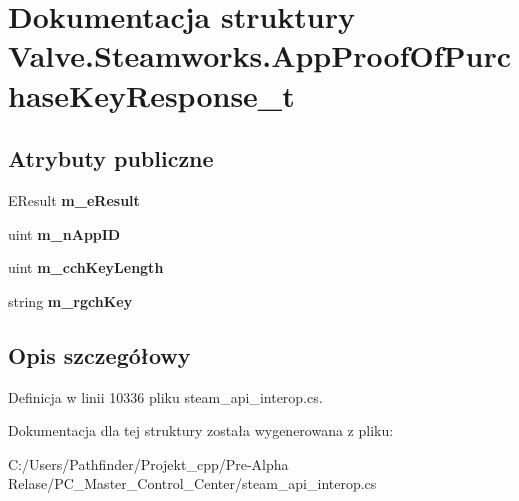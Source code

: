 \hypertarget{struct_valve_1_1_steamworks_1_1_app_proof_of_purchase_key_response__t}{}\section{Dokumentacja struktury Valve.\+Steamworks.\+App\+Proof\+Of\+Purchase\+Key\+Response\+\_\+t}
\label{struct_valve_1_1_steamworks_1_1_app_proof_of_purchase_key_response__t}
\subsection*{Atrybuty publiczne}
\begin{DoxyCompactItemize}
\item 
\mbox{\label{struct_valve_1_1_steamworks_1_1_app_proof_of_purchase_key_response__t_abcb40b93a942c7a7b2475c676a807679}} 
E\+Result {\bfseries m\+\_\+e\+Result}
\item 
\mbox{\label{struct_valve_1_1_steamworks_1_1_app_proof_of_purchase_key_response__t_ac9119233dffae29b25286fbe687e32ee}} 
uint {\bfseries m\+\_\+n\+App\+ID}
\item 
\mbox{\label{struct_valve_1_1_steamworks_1_1_app_proof_of_purchase_key_response__t_a6e352f3ce397bb6a8d24c444a5ed7025}} 
uint {\bfseries m\+\_\+cch\+Key\+Length}
\item 
\mbox{\label{struct_valve_1_1_steamworks_1_1_app_proof_of_purchase_key_response__t_ab63477802fd41c5f4140978b63098772}} 
string {\bfseries m\+\_\+rgch\+Key}
\end{DoxyCompactItemize}


\subsection{Opis szczegółowy}


Definicja w linii 10336 pliku steam\+\_\+api\+\_\+interop.\+cs.



Dokumentacja dla tej struktury została wygenerowana z pliku\+:\begin{DoxyCompactItemize}
\item 
C\+:/\+Users/\+Pathfinder/\+Projekt\+\_\+cpp/\+Pre-\/\+Alpha Relase/\+P\+C\+\_\+\+Master\+\_\+\+Control\+\_\+\+Center/steam\+\_\+api\+\_\+interop.\+cs\end{DoxyCompactItemize}
